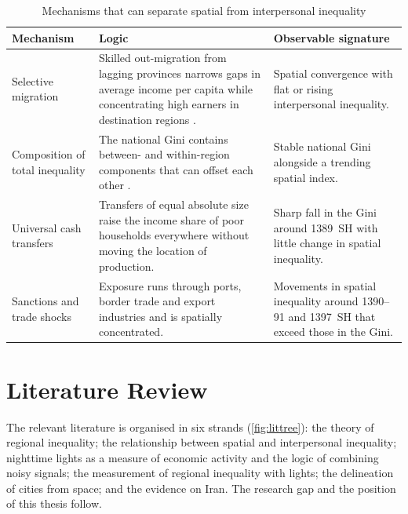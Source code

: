 \documentclass[11pt,a4paper]{article}
\begin{document}
\begin{table}[htbp]
\centering\small
\caption{Mechanisms that can separate spatial from interpersonal inequality}
\label{tab:mechanisms}
\begin{tabularx}{\textwidth}{@{}>{\raggedright\arraybackslash}p{3.1cm}>{\raggedright\arraybackslash}X>{\raggedright\arraybackslash}p{4.1cm}@{}}
\toprule
\textbf{Mechanism} & \textbf{Logic} & \textbf{Observable signature}\\
\midrule
Selective migration & Skilled out-migration from lagging provinces narrows gaps in average income per capita while concentrating high earners in destination regions \citep{Fratesi2014}. & Spatial convergence with flat or rising interpersonal inequality.\\
\addlinespace
Composition of total inequality & The national Gini contains between- and within-region components that can offset each other \citep{Shorrocks2005,Novotny2007}. & Stable national Gini alongside a trending spatial index.\\
\addlinespace
Universal cash transfers & Transfers of equal absolute size raise the income share of poor households everywhere without moving the location of production. & Sharp fall in the Gini around 1389~SH with little change in spatial inequality.\\
\addlinespace
Sanctions and trade shocks & Exposure runs through ports, border trade and export industries and is spatially concentrated. & Movements in spatial inequality around 1390--91 and 1397~SH that exceed those in the Gini.\\
\bottomrule
\end{tabularx}
\end{table}

\section{Literature Review}\label{sec:lit}

The relevant literature is organised in six strands (\cref{fig:littree}): the theory of regional inequality; the relationship between spatial and interpersonal inequality; nighttime lights as a measure of economic activity and the logic of combining noisy signals; the measurement of regional inequality with lights; the delineation of cities from space; and the evidence on Iran. The research gap and the position of this thesis follow.
\end{document}
